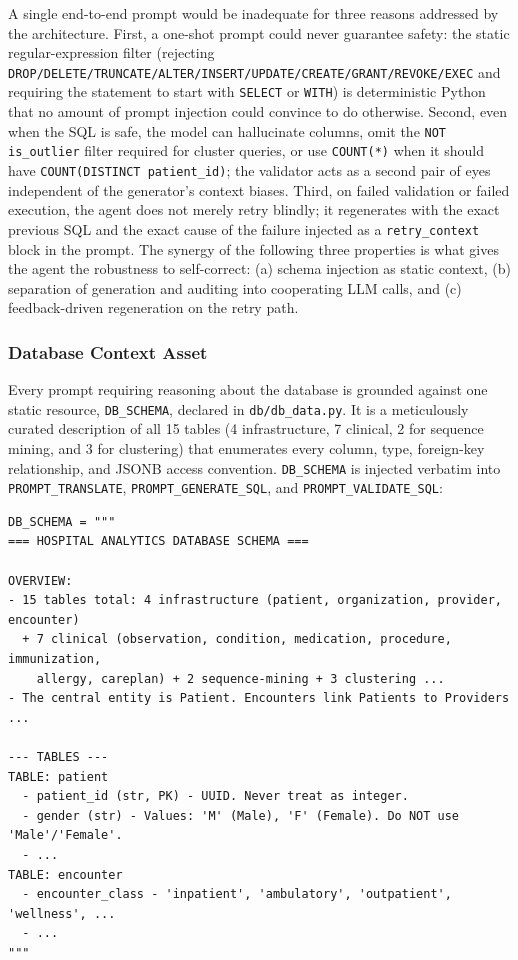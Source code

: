 A single end-to-end prompt would be inadequate for three reasons addressed by the architecture. First, a one-shot prompt could never guarantee safety: the static regular-expression filter (rejecting \texttt{DROP/DELETE/TRUNCATE/ALTER/INSERT/UPDATE/CREATE/GRANT/REVOKE/EXEC} and requiring the statement to start with \texttt{SELECT} or \texttt{WITH}) is deterministic Python that no amount of prompt injection could convince to do otherwise. Second, even when the SQL is safe, the model can hallucinate columns, omit the \texttt{NOT is\_outlier} filter required for cluster queries, or use \texttt{COUNT(*)} when it should have \texttt{COUNT(DISTINCT patient\_id)}; the validator acts as a second pair of eyes independent of the generator's context biases. Third, on failed validation or failed execution, the agent does not merely retry blindly; it regenerates with the exact previous SQL and the exact cause of the failure injected as a \texttt{retry\_context} block in the prompt. The synergy of the following three properties is what gives the agent the robustness to self-correct: (a) schema injection as static context, (b) separation of generation and auditing into cooperating LLM calls, and (c) feedback-driven regeneration on the retry path.

\subsubsection*{Database Context Asset}

Every prompt requiring reasoning about the database is grounded against one static resource, \texttt{DB\_\allowbreak SCHEMA}, declared in \texttt{db/db\_data.py}. It is a meticulously curated description of all 15 tables (4 infrastructure, 7 clinical, 2 for sequence mining, and 3 for clustering) that enumerates every column, type, foreign-key relationship, and JSONB access convention. \texttt{DB\_\allowbreak SCHEMA} is injected verbatim into \texttt{PROMPT\_\allowbreak TRANSLATE}, \texttt{PROMPT\_\allowbreak GENERATE\_\allowbreak SQL}, and \texttt{PROMPT\_\allowbreak VALIDATE\_\allowbreak SQL}:

\begin{lstlisting}[style=pythonstyle]
DB_SCHEMA = """
=== HOSPITAL ANALYTICS DATABASE SCHEMA ===

OVERVIEW:
- 15 tables total: 4 infrastructure (patient, organization, provider, encounter)
  + 7 clinical (observation, condition, medication, procedure, immunization,
    allergy, careplan) + 2 sequence-mining + 3 clustering ...
- The central entity is Patient. Encounters link Patients to Providers ...

--- TABLES ---
TABLE: patient
  - patient_id (str, PK) - UUID. Never treat as integer.
  - gender (str) - Values: 'M' (Male), 'F' (Female). Do NOT use 'Male'/'Female'.
  - ...
TABLE: encounter
  - encounter_class - 'inpatient', 'ambulatory', 'outpatient', 'wellness', ...
  - ...
"""
\end{lstlisting}

